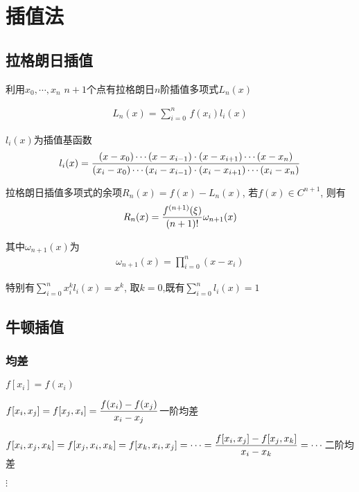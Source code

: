 \chapter{插值法}

\section{拉格朗日插值}

利用$x_0,\cdots,x_n$ $n+1$个点有拉格朗日$n$阶插值多项式$L_n(x)$

\begin{align}
    L_n(x) = \sum_{i=0}^n\,f(x_i)l_i(x)
\end{align}

$l_i(x)$为插值基函数
\begin{align}
    l_i(x) = {(x-x_0)\cdots(x-x_{i-1})\cdot(x-x_{i+1})\cdots(x-x_n) \over (x_i-x_0)\cdots(x_i-x_{i-1})\cdot(x_i-x_{i+1})\cdots(x_i-x_n)}
\end{align}

拉格朗日插值多项式的余项$R_n(x) = f(x) - L_n(x)$, 若$f(x) \in C^{n+1}$, 则有
\begin{align}
    \label{equ:remainv}
    R_n(x) = {f^{(n+1)}(\xi)\over (n+1)!}\omega_{n+1}(x)
\end{align}

\par
\smallskip
其中$\omega_{n+1}(x)$为
\begin{align}
\omega_{n+1}(x) = \prod_{i=0}^{n}(x-x_i)
\end{align}

特别有\(\displaystyle\sum_{i=0}^nx_i^k l_i(x) = x^k\), 
取$k=0$,既有\(\displaystyle \sum_{i=0}^n l_i(x) = 1\)

\section{牛顿插值}

\subsection*{均差}

\(\displaystyle f[x_i] = f(x_i)\)\par
\(\displaystyle f[x_i,x_j] = f[x_j,x_i] = {f(x_i) - f(x_j)\over x_i - x_j}\)\hfill 一阶均差\par
\(\displaystyle f[x_i,x_j,x_k] = f[x_j,x_i,x_k] = f[x_k,x_i,x_j] = \cdots = {f[x_i,x_j] - f[x_j,x_k]\over x_i - x_k} = \cdots\)\hfill 二阶均差\par
$\displaystyle\vdots$

